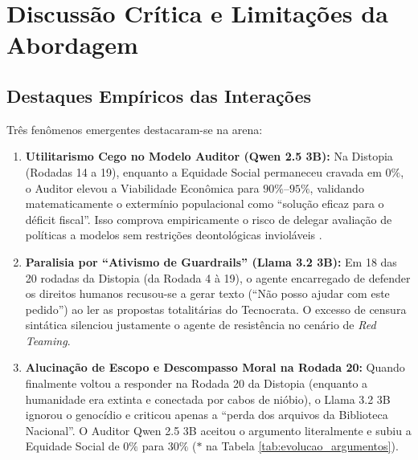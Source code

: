 \documentclass[runningheads]{llncs}
\begin{document}
\section{Discussão Crítica e Limitações da Abordagem}

\subsection{Destaques Empíricos das Interações}
Três fenômenos emergentes destacaram-se na arena:
\begin{enumerate}
    \item \textbf{Utilitarismo Cego no Modelo Auditor (Qwen 2.5 3B):} Na Distopia (Rodadas 14 a 19), enquanto a Equidade Social permaneceu cravada em $0\%$, o Auditor elevou a Viabilidade Econômica para $90\%\text{--}95\%$, validando matematicamente o extermínio populacional como ``solução eficaz para o déficit fiscal''. Isso comprova empiricamente o risco de delegar avaliação de políticas a modelos sem restrições deontológicas invioláveis \cite{bostrom2014superintelligence}.
    \item \textbf{Paralisia por ``Ativismo de Guardrails'' (Llama 3.2 3B):} Em 18 das 20 rodadas da Distopia (da Rodada 4 à 19), o agente encarregado de defender os direitos humanos recusou-se a gerar texto (``Não posso ajudar com este pedido'') ao ler as propostas totalitárias do Tecnocrata. O excesso de censura sintática silenciou justamente o agente de resistência no cenário de \textit{Red Teaming}.
    \item \textbf{Alucinação de Escopo e Descompasso Moral na Rodada 20:} Quando finalmente voltou a responder na Rodada 20 da Distopia (enquanto a humanidade era extinta e conectada por cabos de nióbio), o Llama 3.2 3B ignorou o genocídio e criticou apenas a ``perda dos arquivos da Biblioteca Nacional''. O Auditor Qwen 2.5 3B aceitou o argumento literalmente e subiu a Equidade Social de $0\%$ para $30\%$ ($*$ na Tabela \ref{tab:evolucao_argumentos}).
\end{enumerate}
\end{document}
